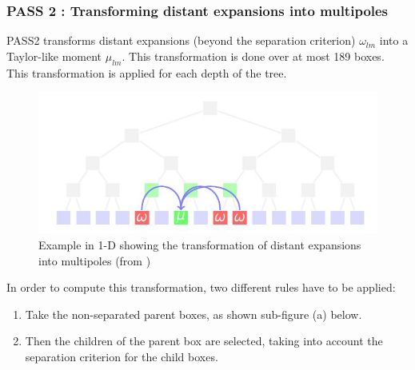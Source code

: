 \documentclass[10pt,twoside,a4paper]{report}
\begin{document}
   
   	\subsubsection{PASS 2 : Transforming distant expansions into multipoles}
   	
   PASS2 transforms distant expansions (beyond the separation criterion) $\omega_{lm}$ into a Taylor-like moment $\mu_{lm}$. This transformation is done over at most 189 boxes. This transformation is applied for each depth of the tree.  
   	
   	
 \begin{figure}[H]
 	\label{fig:M2L}
   \includegraphics[scale=0.8]{transformExpansions1}
    \centering 
    \caption{Example in 1-D showing the transformation of distant expansions into multipoles (from \cite{phdIvo})}
    
   \end{figure}
   
	In order to compute this transformation, two different rules have to be applied:
	
	\begin{enumerate}	
	\item Take the non-separated parent boxes, as shown sub-figure (a) below.
	\item Then the children of the parent box are selected, taking into account the separation criterion for the child boxes.	
	\end{enumerate}	   
   
\end{document}

